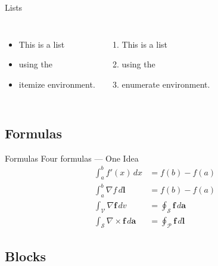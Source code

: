 \documentclass[fleqn,compress,utf8,aspectratio=169,t]{beamer}
\begin{document}
\begin{frame}{Lists}
  \begin{columns}[t]
    \begin{itemize}
      \item This is a list
      \item using the
      \item itemize environment.
    \end{itemize}
    \begin{enumerate}
      \item This is a list
      \item using the
      \item enumerate environment.
    \end{enumerate}
  \end{columns}
\end{frame}

\subsection{Formulas}

\begin{frame}{Formulas}
  Four formulas --- One Idea
  \begin{align}
    \int^{b}_{a} f'(x) \, dx                                 & = f(b) - f(a) \\
    \int^b_{a} \nabla f\,d\mathbf{l}                         & = f(b) - f(a) \\
    \int_{\mathcal{V}} \nabla\mathbf{f} \, dv                & =
    \oint_{\mathcal{S}} \mathbf{f} \, d\mathbf{a}                            \\
    \int_{\mathcal{S}} \nabla\times\mathbf{f} \, d\mathbf{a} & =
    \oint_{\mathcal{P}} \mathbf{f} \, d\mathbf{l}
  \end{align}
\end{frame}

\subsection{Blocks}
\end{document}
